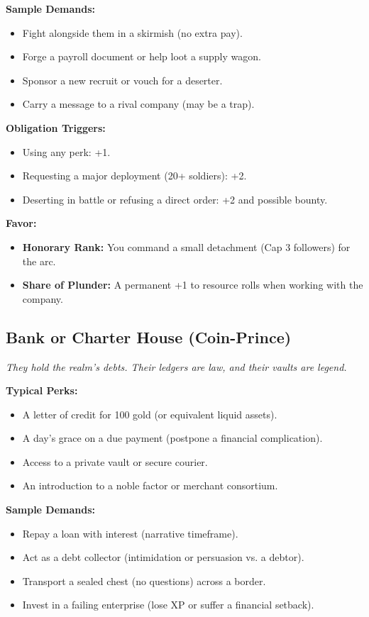 \textbf{Sample Demands:}
\begin{itemize}
  \item Fight alongside them in a skirmish (no extra pay).
  \item Forge a payroll document or help loot a supply wagon.
  \item Sponsor a new recruit or vouch for a deserter.
  \item Carry a message to a rival company (may be a trap).
\end{itemize}

\textbf{Obligation Triggers:}
\begin{itemize}
  \item Using any perk: +1.
  \item Requesting a major deployment (20+ soldiers): +2.
  \item Deserting in battle or refusing a direct order: +2 and possible bounty.
\end{itemize}

\textbf{Favor:}
\begin{itemize}
  \item \textbf{Honorary Rank:} You command a small detachment (Cap 3 followers) for the arc.
  \item \textbf{Share of Plunder:} A permanent +1 to resource rolls when working with the company.
\end{itemize}

\subsection{Bank or Charter House (Coin-Prince)}

\textit{They hold the realm’s debts. Their ledgers are law, and their vaults are legend.}

\textbf{Typical Perks:}
\begin{itemize}
  \item A letter of credit for 100 gold (or equivalent liquid assets).
  \item A day’s grace on a due payment (postpone a financial complication).
  \item Access to a private vault or secure courier.
  \item An introduction to a noble factor or merchant consortium.
\end{itemize}

\textbf{Sample Demands:}
\begin{itemize}
  \item Repay a loan with interest (narrative timeframe).
  \item Act as a debt collector (intimidation or persuasion vs. a debtor).
  \item Transport a sealed chest (no questions) across a border.
  \item Invest in a failing enterprise (lose XP or suffer a financial setback).
\end{itemize}


